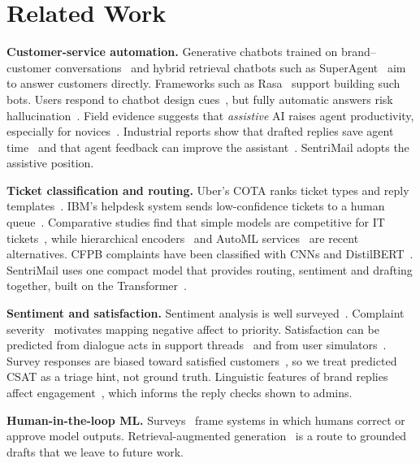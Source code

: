 \documentclass[conference]{IEEEtran}
\begin{document}
\section{Related Work}
\textbf{Customer-service automation.} Generative chatbots trained on brand--customer conversations~\cite{xu2017new,hardalov2018towards} and hybrid retrieval chatbots such as SuperAgent~\cite{cui2017superagent} aim to answer customers directly. Frameworks such as Rasa~\cite{bocklisch2017rasa} support building such bots. Users respond to chatbot design cues~\cite{adam2021ai}, but fully automatic answers risk hallucination~\cite{ji2023survey}. Field evidence suggests that \emph{assistive} AI raises agent productivity, especially for novices~\cite{brynjolfsson2025generative}. Industrial reports show that drafted replies save agent time~\cite{howell2023economic} and that agent feedback can improve the assistant~\cite{zhao2025agent}. SentriMail adopts the assistive position.

\textbf{Ticket classification and routing.} Uber's COTA ranks ticket types and reply templates~\cite{molino2018cota}. IBM's helpdesk system sends low-confidence tickets to a human queue~\cite{mandal2018cognitive}. Comparative studies find that simple models are competitive for IT tickets~\cite{revina2020it}, while hierarchical encoders~\cite{zangari2023ticket} and AutoML services~\cite{truss2024ai} are recent alternatives. CFPB complaints have been classified with CNNs and DistilBERT~\cite{oyewola2023consumer}. SentriMail uses one compact model that provides routing, sentiment and drafting together, built on the Transformer~\cite{vaswani2017attention}.

\textbf{Sentiment and satisfaction.} Sentiment analysis is well surveyed~\cite{zhang2018deep,wankhade2022survey}. Complaint severity~\cite{jin2021modeling} motivates mapping negative affect to priority. Satisfaction can be predicted from dialogue acts in support threads~\cite{oraby2017how} and from user simulators~\cite{sun2021simulating}. Survey responses are biased toward satisfied customers~\cite{park2018positivity}, so we treat predicted CSAT as a triage hint, not ground truth. Linguistic features of brand replies affect engagement~\cite{singh2022linguistic}, which informs the reply checks shown to admins.

\textbf{Human-in-the-loop ML.} Surveys~\cite{wu2022survey,mosqueirarey2023human} frame systems in which humans correct or approve model outputs. Retrieval-augmented generation~\cite{lewis2020rag} is a route to grounded drafts that we leave to future work.
\end{document}
